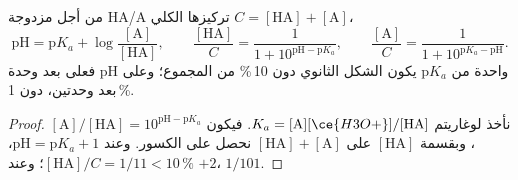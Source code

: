 \begin{proposition}\label{prop:b1:predominant-reaction:henderson}
من أجل مزدوجة HA/A تركيزها الكلي $C = [\mathrm{HA}] + [\mathrm{A}]$،
\[
  \mathrm{pH} = \mathrm{p}K_a + \log\frac{[\mathrm{A}]}{[\mathrm{HA}]}, \qquad
  \frac{[\mathrm{HA}]}{C} = \frac{1}{1 + 10^{\mathrm{pH} - \mathrm{p}K_a}}, \qquad
  \frac{[\mathrm{A}]}{C} = \frac{1}{1 + 10^{\mathrm{p}K_a - \mathrm{pH}}} .
\]
فعلى بعد وحدة pH واحدة من $\mathrm{p}K_a$ يكون الشكل الثانوي دون
10\,\% من المجموع؛ وعلى بعد وحدتين، دون 1\,\%.
\end{proposition}

\begin{proof}
نأخذ لوغاريتم $K_a = [\mathrm{A}][\ce{H3O+}]/[\mathrm{HA}]$. فيكون
$[\mathrm{A}]/[\mathrm{HA}] = 10^{\mathrm{pH}-\mathrm{p}K_a}$، وبقسمة
$[\mathrm{HA}]$ على $[\mathrm{HA}] + [\mathrm{A}]$ نحصل على الكسور. وعند
$\mathrm{pH} = \mathrm{p}K_a + 1$، $[\mathrm{HA}]/C = 1/11 < 10\,\%$؛ وعند
$+2$، $1/101$.
\end{proof}

